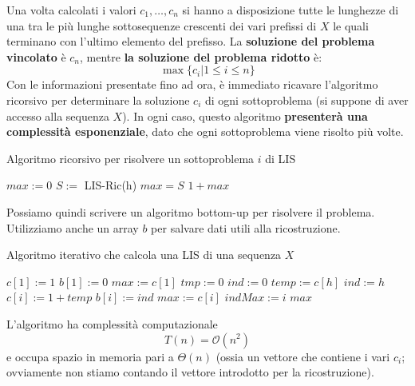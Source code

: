\documentclass[12pt]{article}
\begin{document}
Una volta calcolati i valori $c_1, \dots, c_n$ si hanno a disposizione tutte le lunghezze di una tra le più lunghe sottosequenze crescenti dei vari prefissi di $X$ le quali terminano
con l'ultimo elemento del prefisso. La \textbf{soluzione del problema vincolato} è $c_n$, mentre \textbf{la soluzione del problema ridotto} è:
$$\max\{c_i|1 \leq i \leq n\}$$
Con le informazioni presentate fino ad ora, è immediato ricavare l'algoritmo ricorsivo per determinare la soluzione $c_i$ di ogni sottoproblema (si suppone di aver accesso alla sequenza $X$). In ogni caso, questo algoritmo
\textbf{presenterà una complessità esponenziale}, dato che ogni sottoproblema viene risolto più volte. \newline
\begin{algorithm}[H]
    \caption{Algoritmo ricorsivo per risolvere un sottoproblema $i$ di LIS}
    \DontPrintSemicolon
     {
         {
        } {
            $max := 0$ \;
             {
                 {
                    $S := $ LIS-Ric(h) \;
                     {
                        $max = S$
                    }
                }
            }
            \Return $1 + max$
        }
    }
\end{algorithm} \noindent
Possiamo quindi scrivere un algoritmo bottom-up per risolvere il problema. Utilizziamo
anche un array $b$ per salvare dati utili alla ricostruzione. \newline
\begin{algorithm}[H]
    \caption{Algoritmo iterativo che calcola una LIS di una sequenza $X$}
    \DontPrintSemicolon
     {
        $c[1] := 1$ \;
        $b[1] := 0$ \;
        $max := c[1]$ \;
         {
            $tmp := 0$ \;
            $ind := 0$ \;
             {
                 {
                    $temp := c[h]$ \;
                    $ind := h$
                }
                $c[i] :=  1 + temp$ \;
                $b[i] := ind$ \;
                 {
                    $max := c[i]$ \;
                    $indMax := i$
                }
            }
        }
        \Return $max$
    }
\end{algorithm}\noindent
L'algoritmo ha complessità computazionale
$$T(n) = \mathcal{O}(n^2)$$
e occupa spazio in memoria pari a $\Theta(n)$ (ossia un vettore che contiene i vari $c_i$; ovviamente non stiamo contando il vettore introdotto per la ricostruzione).
\end{document}
